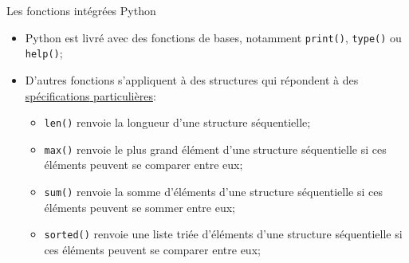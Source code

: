 \documentclass[dvipsnames]{beamer}
\begin{document}
\begin{frame}
    [fragile]{Les fonctions intégrées Python}

    \begin{itemize}
        \item Python est livré avec des fonctions de bases, notamment
              \texttt{\small print()}, \texttt{\small type()} ou \texttt{\small
                  help()};
        \item D'autres fonctions s'appliquent à des structures qui répondent à
              des \alert{\underline{{spécifications} \normalfont\color{black}
                      particulières}}:\vspace{.3em}
              \begin{itemize}
                  \small
                  \setlength{\itemsep}{0pt}\setlength{\parskip}{.3em}
                  \item \texttt{\small len()} renvoie la longueur d'une structure
                        séquentielle;
                  \item \texttt{\small max()} renvoie le plus grand élément d'une
                        structure séquentielle si ces éléments peuvent se
                        comparer entre eux;
                  \item \texttt{\small sum()} renvoie la somme d'éléments d'une
                        structure séquentielle si ces éléments peuvent se sommer
                        entre eux;
                  \item \texttt{\small sorted()} renvoie une liste triée d'éléments
                        d'une structure séquentielle si ces éléments peuvent se
                        comparer entre eux;
              \end{itemize}
    \end{itemize}
\end{frame}

\end{document}

